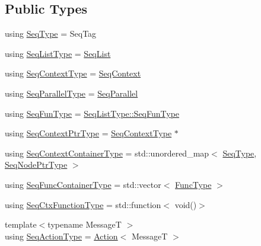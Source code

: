 \subsection*{Public Types}
\begin{DoxyCompactItemize}
\item 
using \hyperlink{structvt_1_1seq_1_1_tagged_sequencer_a1c8ee839258d0f88c49ef660267a81d5}{Seq\+Type} = Seq\+Tag
\item 
using \hyperlink{structvt_1_1seq_1_1_tagged_sequencer_a8df6e02cdb7c2b38870f7ee7776f6f9c}{Seq\+List\+Type} = \hyperlink{structvt_1_1seq_1_1_seq_list}{Seq\+List}
\item 
using \hyperlink{structvt_1_1seq_1_1_tagged_sequencer_a73020a327d57aa8eac042e558b1b2e30}{Seq\+Context\+Type} = \hyperlink{structvt_1_1seq_1_1_seq_context}{Seq\+Context}
\item 
using \hyperlink{structvt_1_1seq_1_1_tagged_sequencer_a90808f66a0bd9a5e523c86f00c4b295d}{Seq\+Parallel\+Type} = \hyperlink{structvt_1_1seq_1_1_seq_parallel}{Seq\+Parallel}
\item 
using \hyperlink{structvt_1_1seq_1_1_tagged_sequencer_a87fb29cbd9fa0823f2b4fad1ac111993}{Seq\+Fun\+Type} = \hyperlink{structvt_1_1seq_1_1_seq_list_afa5aacad3530e543d1ea016acbfb1cbb}{Seq\+List\+Type\+::\+Seq\+Fun\+Type}
\item 
using \hyperlink{structvt_1_1seq_1_1_tagged_sequencer_aba4239ea7f93cdd16765f1ddcc6a1a6b}{Seq\+Context\+Ptr\+Type} = \hyperlink{structvt_1_1seq_1_1_tagged_sequencer_a73020a327d57aa8eac042e558b1b2e30}{Seq\+Context\+Type} $\ast$
\item 
using \hyperlink{structvt_1_1seq_1_1_tagged_sequencer_ad936050c5f6a8b28457e1056ed5dc57e}{Seq\+Context\+Container\+Type} = std\+::unordered\+\_\+map$<$ \hyperlink{structvt_1_1seq_1_1_tagged_sequencer_a1c8ee839258d0f88c49ef660267a81d5}{Seq\+Type}, \hyperlink{namespacevt_1_1seq_ae6a4874b585be0612aaca32ca6d2d191}{Seq\+Node\+Ptr\+Type} $>$
\item 
using \hyperlink{structvt_1_1seq_1_1_tagged_sequencer_a3843fac93a70e2d9375b33515938696f}{Seq\+Func\+Container\+Type} = std\+::vector$<$ \hyperlink{namespacevt_1_1seq_a26c632e5cbf02395a8bbd9aa4c761232}{Func\+Type} $>$
\item 
using \hyperlink{structvt_1_1seq_1_1_tagged_sequencer_ad8a1ed9b8c012cf2a73ebd2e46d6d899}{Seq\+Ctx\+Function\+Type} = std\+::function$<$ void()$>$
\item 
{\footnotesize template$<$typename MessageT $>$ }\\using \hyperlink{structvt_1_1seq_1_1_tagged_sequencer_a0210dbd34288d440e0cd51db9d6637bd}{Seq\+Action\+Type} = \hyperlink{structvt_1_1seq_1_1_action}{Action}$<$ MessageT $>$

\end{DoxyCompactItemize}
